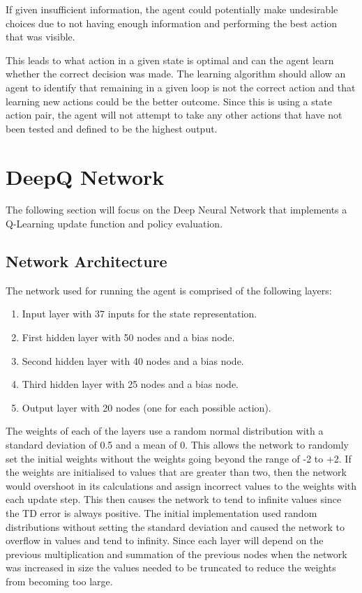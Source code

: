 If given insufficient information, the agent could potentially make undesirable
choices due to not having enough information and performing the best
action that was visible.

This leads to what action in a given state is optimal and can the agent learn
whether the correct decision was made. The learning algorithm should allow an
agent to identify that remaining in a given loop is not the correct action and
that learning new actions could be the better outcome. Since this is using a
state action pair, the agent will not attempt to take any other actions that
have not been tested and defined to be the highest output.

\section{DeepQ Network}

The following section will focus on the Deep Neural Network that implements a
Q-Learning update function and policy evaluation.

\subsection{Network Architecture}

The network used for running the agent is comprised of the following layers:

\begin{enumerate}
    \item Input layer with 37 inputs for the state representation.
    \item First hidden layer with 50 nodes and a bias node.
    \item Second hidden layer with 40 nodes and a bias node.
    \item Third hidden layer with 25 nodes and a bias node.
    \item Output layer with 20 nodes (one for each possible action).
\end{enumerate}

The weights of each of the layers use a random normal distribution with a
standard deviation of 0.5 and a mean of 0. This allows the network to randomly
set the initial weights without the weights going beyond the range of -2 to +2.
If the weights are initialised to values that are greater than two, then the
network would overshoot in its calculations and assign incorrect values to the
weights with each update step. This then causes the network to tend to infinite
values since the TD error is always positive. The initial implementation used
random distributions without setting the standard deviation and caused the
network to overflow in values and tend to infinity. Since each layer will depend
on the previous multiplication and summation of the previous nodes when the
network was increased in size the values needed to be truncated to reduce the
weights from becoming too large.

